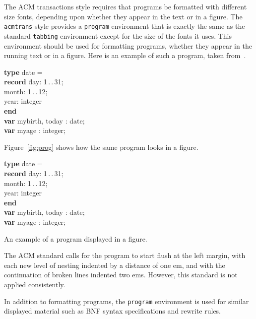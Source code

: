 The ACM transactions style requires that programs be formatted with
different size fonts, depending upon whether they appear in the text or
in a figure.  The {\tt acmtrans} style provides a {\tt program}
environment that is exactly the same as the standard {\tt tabbing}
environment except for the size of the fonts it uses.  This environment
should be used for formatting programs, whether they appear in the
running text or in a figure.  Here is an example of such a program,
taken from~.
\begin{program}
{\bf type} date =\\
\hspace*{1em}\= {\bf record} \= day: 1\,.\,.\,31;\+\+\\
                                month: 1\,.\,.\,12;\\
                                year: integer \-\\
                {\bf end} \-\\
{\bf var} mybirth, today : date;\\
{\bf var} myage : integer;
\end{program}
Figure~\ref{fig:prog} shows how the same program looks in a figure.
\begin{narrowfig}{104pt}
\begin{program}
{\bf type} date =\\
\hspace*{1em}\= {\bf record} \= day: 1\,.\,.\,31;\+\+\\
                                month: 1\,.\,.\,12;\\
                                year: integer \-\\
                {\bf end} \-\\
{\bf var} mybirth, today : date;\\
{\bf var} myage : integer;
\end{program}
\caption{An example of a program displayed in a figure.}
\label{fig:prog}
\end{narrowfig}


The ACM standard calls for the program to start flush at the left
margin, with each new level of nesting indented by a distance of one
em, and with the continuation of broken lines indented two ems.  However,
this standard is not applied consistently.

In addition to formatting programs, the {\tt program} environment is
used for similar displayed material such as BNF syntax specifications
and rewrite rules.

